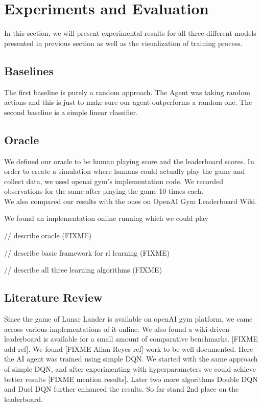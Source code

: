 \section{Experiments and Evaluation}
In this section, we will present experimental results for all three different models presented in previous section as well as the visualization of training process.

\subsection{ Baselines}
The first baseline is purely a random approach. The Agent was taking random actions and this is just to make sure our agent outperforms a random one. 
The second baseline is a simple linear classifier.

\subsection{Oracle}

We defined our oracle to be human playing score and the leaderboard scores. In order to create a simulation where humans could actually play the game and collect data, we used openai gym's implementation code. We recorded observations for the same after playing the game 10 times each. \\

We also compared our results with the ones on OpenAI Gym Leaderboard Wiki.

We found an implementation online running which we could play 

// describe oracle (FIXME)

// describe basic framework for rl learning (FIXME)

// describe all three learning algorithms (FIXME)

\subsection{Literature Review}

Since the game of Lunar Lander is available on openAI gym platform, we came across various implementations of it online. We also found a wiki-driven leaderboard is available for a small amount of comparative benchmarks. [FIXME add ref]. We found [FIXME Allan Reyes ref] work to be well documented. Here the AI agent was trained using simple DQN. We started with the same approach of simple DQN, and after experimenting with hyperparameters we could achieve better results [FIXME mention results]. Later two more algorithms Double DQN and Duel DQN further enhanced the results. So far stand 2nd place on the leaderboard. 

